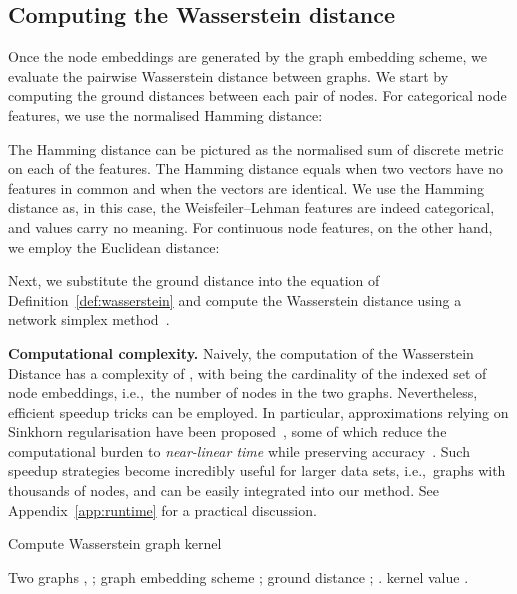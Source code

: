 \documentclass{article}
\begin{document}
\subsection{Computing the Wasserstein distance}



Once the node embeddings are generated by the graph embedding scheme, we evaluate the pairwise Wasserstein distance between graphs. We start by computing the ground distances between each pair of nodes. For categorical node features, we use the normalised Hamming distance:


The Hamming distance can be pictured as the normalised sum of discrete metric  on each of the features.
The Hamming distance equals  when two vectors have no features in common and  when the vectors are identical. 
We use the Hamming distance as, in this case, the Weisfeiler--Lehman features are indeed categorical, and values carry no meaning.
For continuous node features, on the other hand, we employ the Euclidean distance: 


Next, we substitute the ground distance into the equation of Definition~\ref{def:wasserstein} and compute the Wasserstein distance using a network simplex method~\citep{peyre2019computational}. 

\textbf{Computational complexity.}
Naively, the computation of the Wasserstein Distance has a complexity of , with  being the cardinality of the indexed set of node embeddings, i.e.,\ the number of nodes in the two graphs. Nevertheless, efficient speedup tricks can be employed. In particular, approximations relying on Sinkhorn regularisation have been proposed~\citep{cuturi2013sinkhorn}, some of which reduce the computational burden to \textit{near-linear time} while preserving accuracy~\citep{altschuler2017near}. Such speedup strategies become incredibly useful for larger data sets, i.e.,\ graphs with thousands of nodes, and can be easily integrated into our method. See  Appendix~\ref{app:runtime} for a practical discussion.



\begin{algorithm}[tb]
   \caption{Compute Wasserstein graph kernel}
   \label{alg:gwk}
\begin{algorithmic}
    Two graphs , ; graph embedding scheme ; ground distance ; .
    kernel value .
   \\
   \STATE  {}
   \STATE  {}
   \STATE  {}
   
   \STATE 
\end{algorithmic}
\end{algorithm}
\end{document}
